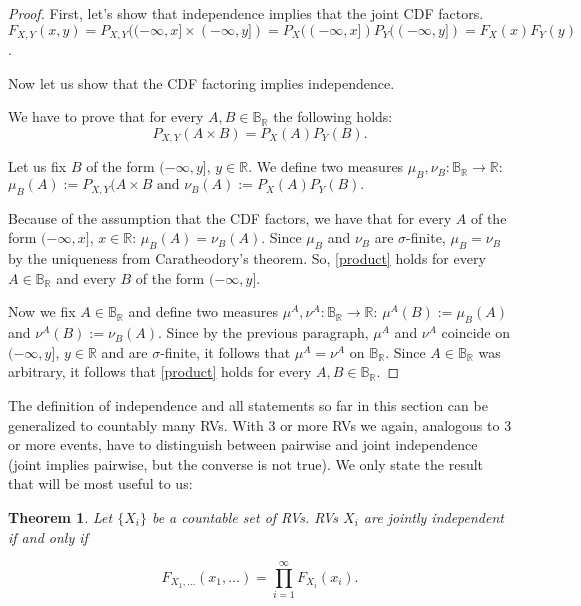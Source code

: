 \documentclass{book}
\theoremstyle{plain}%
\newtheorem{theorem}{Theorem}[section]
\theoremstyle{definition}
\newlength{\arrow}
\begin{document}
\begin{proof}
First, let's show that independence implies that the joint CDF factors. $F_{X,Y}(x,y) = P_{X,Y}((-\infty,x] \times (-\infty,y]) = P_X((-\infty,x])P_Y((-\infty,y]) = F_X(x)F_Y(y)$.

Now let us show that the CDF factoring implies independence.

We have to prove that for every $A,B \in \mathbb{B}_\mathbb{R}$ the following holds:
\begin{equation}
	\label{product}
		P_{X,Y} (A\times B)=P_X(A)P_Y(B).
\end{equation}


Let us fix $B$ of the form $(-\infty, y]$, $y \in \mathbb{R}$. We define two measures
$\mu_B,\nu_B :\mathbb{B}_\mathbb{R} \rightarrow \mathbb{R}$: $\mu_B(A) := P_{X,Y}(A \times B \text{ and }\nu_B(A) := P_X(A)P_Y(B).$

Because of the assumption that the CDF factors, we have that for every $A$ of the form $(-\infty, x]$, $x \in \mathbb{R}$:
$\mu_B(A) = \nu_B(A)$.
Since $\mu_B$ and $\nu_B$ are $\sigma$-finite, $\mu_B = \nu_B$ by the uniqueness from Caratheodory's theorem. So,
\eqref{product} holds
for every $A \in \mathbb{B}_\mathbb{R}$ and every $B$ of the form $(-\infty, y]$.

Now we fix $A\in \mathbb{B}_\mathbb{R}$ and define two measures $\mu^A,\nu^A:\mathbb{B}_\mathbb{R} \rightarrow \mathbb{R}$: $\mu^A(B):=\mu_B(A)$ and $\nu^A(B):=\nu_B(A)$. Since by the previous paragraph, $\mu^A$ and $\nu^A$ coincide on $(-\infty, y]$, $y \in \mathbb{R}$ and are $\sigma$-finite, it follows that $\mu^A = \nu^A$ on $\mathbb{B}_\mathbb{R}$. Since $A\in \mathbb{B}_\mathbb{R}$ was arbitrary, it follows that \eqref{product} holds for every $A,B \in \mathbb{B}_\mathbb{R}$.

\end{proof}

The definition of independence and all statements so far in this section can be generalized to countably many RVs. With 3 or more RVs we again, analogous to 3 or more events, have to distinguish between pairwise and joint independence (joint implies pairwise, but the converse is not true). We only state the result that will be most useful to us:

\begin{theorem}
Let $\{X_i\}$ be a countable set of RVs. RVs $X_i$ are jointly independent if and only if

$$F_{X_1,\dots}(x_1,\dots) = \prod_{i=1}^\infty F_{X_i}(x_i).$$
\end{theorem}
\end{document}
